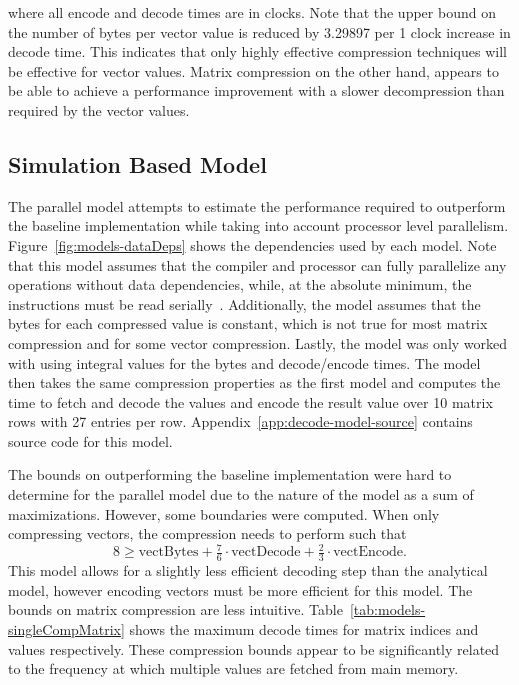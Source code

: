 where all encode and decode times are in clocks.
Note that the upper bound on the number of bytes per vector value is reduced by 3.29897 per 1 clock increase in decode time.
This indicates that only highly effective compression techniques will be effective for vector values.
Matrix compression on the other hand, appears to be able to achieve a performance improvement with a slower decompression than required by the vector values.

\subsection{Simulation Based Model}
The parallel model attempts to estimate the performance required to outperform the baseline implementation while taking into account processor level parallelism.
Figure~\ref{fig:models-dataDeps} shows the dependencies used by each model.
Note that this model assumes that the compiler and processor can fully parallelize any operations without data dependencies, while, at the absolute minimum, the instructions must be read serially~\cite{Hennessy:1990:ComputerArchitecture}.
Additionally, the model assumes that the bytes for each compressed value is constant, which is not true for most matrix compression and for some vector compression.
Lastly, the model was only worked with using integral values for the bytes and decode/encode times.
The model then takes the same compression properties as the first model and computes the time to fetch and decode the values and encode the result value over 10 matrix rows with 27 entries per row.
Appendix~\ref{app:decode-model-source} contains source code for this model.



The bounds on outperforming the baseline implementation were hard to determine for the parallel model due to the nature of the model as a sum of maximizations.
However, some boundaries were computed.
When only compressing vectors, the compression needs to perform such that
\[
	8 \geq \mathrm{vectBytes} + \tfrac{7}{6}\cdot \mathrm{vectDecode} + \tfrac{2}{3} \cdot \mathrm{vectEncode}.
\]
This model allows for a slightly less efficient decoding step than the analytical model, however encoding vectors must be more efficient for this model.
The bounds on matrix compression are less intuitive.
Table~\ref{tab:models-singleCompMatrix} shows the maximum decode times for matrix indices and values respectively.
These compression bounds appear to be significantly related to the frequency at which multiple values are fetched from main memory.





